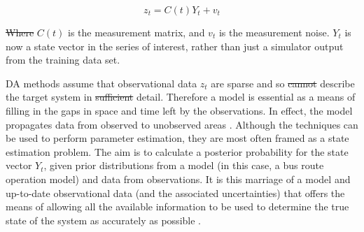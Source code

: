 \documentclass[11pt]{article}
\providecommand{\DIFaddtex}[1]{{\protect\color{blue}\uwave{#1}}} %
\providecommand{\DIFdeltex}[1]{{\protect\color{red}\sout{#1}}}                      %
\providecommand{\DIFaddbegin}{} %
\providecommand{\DIFaddend}{} %
\providecommand{\DIFdelbegin}{} %
\providecommand{\DIFdelend}{} %
\providecommand{\DIFadd}[1]{\texorpdfstring{\DIFaddtex{#1}}{#1}} %
\providecommand{\DIFdel}[1]{\texorpdfstring{\DIFdeltex{#1}}{}} %
\newcommand{\DIFscaledelfig}{0.5}
\newlength{\DIFdelgraphicswidth} %
\newlength{\DIFdelgraphicsheight} %
\newcommand{\DIFaddincludegraphics}[2][]{{\color{blue}\fbox{\DIFOincludegraphics[#1]{#2}}}} %
\newcommand{\DIFdelincludegraphics}[2][]{%
\sbox{\DIFdelgraphicsbox}{\DIFOincludegraphics[#1]{#2}}%
\settoboxwidth{\DIFdelgraphicswidth}{\DIFdelgraphicsbox} %
\settoboxtotalheight{\DIFdelgraphicsheight}{\DIFdelgraphicsbox} %
\scalebox{\DIFscaledelfig}{%
\parbox[b]{\DIFdelgraphicswidth}{\usebox{\DIFdelgraphicsbox}\\[-\baselineskip] \rule{\DIFdelgraphicswidth}{0em}}\llap{\resizebox{\DIFdelgraphicswidth}{\DIFdelgraphicsheight}{%
\setlength{\unitlength}{\DIFdelgraphicswidth}%
\begin{picture}(1,1)%
\thicklines\linethickness{2pt} %
{\color[rgb]{1,0,0}\put(0,0){\framebox(1,1){}}}%
{\color[rgb]{1,0,0}\put(0,0){\line( 1,1){1}}}%
{\color[rgb]{1,0,0}\put(0,1){\line(1,-1){1}}}%
\end{picture}%
}\hspace*{3pt}}} %
} %
\DeclareRobustCommand{\DIFaddbegin}{\DIFOaddbegin \let\includegraphics\DIFaddincludegraphics} %
\DeclareRobustCommand{\DIFaddend}{\DIFOaddend \let\includegraphics\DIFOincludegraphics} %
\DeclareRobustCommand{\DIFdelbegin}{\DIFOdelbegin \let\includegraphics\DIFdelincludegraphics} %
\DeclareRobustCommand{\DIFdelend}{\DIFOaddend \let\includegraphics\DIFOincludegraphics} %
\begin{document}
\DIFdelend \begin{equation}
    z_t = C(t) Y_{t} + v_t
    \label{e:statespace2}
\end{equation}
\DIFdelbegin %

\DIFdel{Where }\DIFdelend \DIFaddbegin \DIFadd{where }\DIFaddend $C(t)$ is the measurement matrix, and $v_t$ is the measurement noise. $Y_t$ is now a state vector in the series of interest, rather than just a simulator output from the training data set. 

DA methods assume that observational data $z_t$ are sparse and so \DIFdelbegin \DIFdel{cannot }\DIFdelend \DIFaddbegin \DIFadd{only }\DIFaddend describe the target system in \DIFdelbegin \DIFdel{sufficient }\DIFdelend \DIFaddbegin \DIFadd{limited }\DIFaddend detail. Therefore a model is essential as a means of filling in the gaps in space and time left by the observations. In effect, the model propagates data from observed to unobserved areas \citep{carrassi_data_2018}.  Although the techniques can be used to perform parameter estimation, they are most often framed as a state estimation problem. The aim is to calculate a posterior probability for the state vector $Y_t$, given prior distributions from a model (in this case, a bus route operation model) and data from observations. It is this marriage of a model and up-to-date observational data (and the  associated uncertainties) that offers the means of allowing all the available information to be used to determine the true state of the system as accurately as possible \citep{talagrand_use_1991}.
\end{document}
